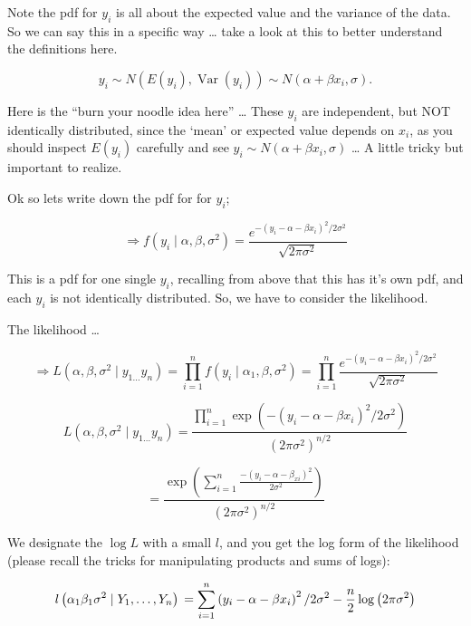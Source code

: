 \documentclass[
  12 pt,
  a4paper,
]{book}
\numberwithin{equation}{section}
\theoremstyle{plain}      %
\theoremstyle{definition} %
\theoremstyle{remark}     %
\theoremstyle{note}         %
\begin{document}
Note the pdf for \(y_{i}\) is all about the expected value and the
variance of the data. So we can say this in a specific way \ldots{} take
a look at this to better understand the definitions here.

\[
y_{i} \sim N\left(E\left(y_{i}\right), \operatorname{Var}\left(y_{i}\right)\right) \sim N\left(\alpha+\beta x_{i}, \sigma\right).
\]

Here is the ``burn your noodle idea here'' \ldots{} These \(y_{i}\) are
independent, but NOT identically distributed, since the `mean' or
expected value depends on \(x_{i}\), as you should inspect
\(E\left(y_{i}\right)\) carefully and see
\(y_{i} \sim N\left(\alpha+\beta x_{i}, \sigma\right)\) \ldots{} A
little tricky but important to realize.

Ok so lets write down the pdf for for \(y_{i}\);

\[
\Rightarrow f\left(y_{i} \mid \alpha, \beta, \sigma^{2}\right)=\frac{e^{-\left(y_{i}-\alpha-\beta x_{i}\right)^{2} / 2 \sigma^{2}}}{\sqrt{2 \pi \sigma^{2}}}
\]

This is a pdf for one single \(y_{i}\), recalling from above that this
has it's own pdf, and each \(y_{i}\) is not identically distributed. So,
we have to consider the likelihood.

The likelihood \ldots{}

\[
\Rightarrow L\left(\alpha,\beta, \sigma^{2} \mid y_{1 \ldots} y_{n}\right)=\prod_{i=1}^{n} f\left(y_{i} \mid \alpha_{1}, \beta, \sigma^{2}\right) = \prod_{i=1}^{n}\frac{e^{-\left(y_{i}-\alpha-\beta x_{i}\right)^{2} / 2 \sigma^{2}}}{\sqrt{2 \pi \sigma^{2}}}
\]

\[
L\left(\alpha,\beta, \sigma^{2} \mid y_{1 \ldots} y_{n}\right) =
\frac{\prod_{i=1}^{n} \exp \left(-\left(y_{i}-\alpha-\beta x_{i}\right)^{2} / 2 \sigma^{2}\right)}{\left(2 \pi \sigma^{2}\right)^{n / 2}}
\]

\[
= \frac{\exp ( \sum_{i=1}^{n} \frac{-\left(y_{i}-\alpha-\beta_{x i}\right)^{2}}{2 \sigma^{2}})}{\left(2 \pi \sigma^{2}\right)^{n / 2}}
\]

We designate the \(\log L\) with a small \(l\), and you get the log form
of the likelihood (please recall the tricks for manipulating products
and sums of logs):

\[
l\left(\alpha_{1} \beta_{1} \sigma^{2} \mid Y_{1}, \ldots, Y_{n}\right) \\
=\sum_{i=1}^{n}\left(y_{i}-\alpha-\beta x_{i}\right)^{2} / 2 \sigma^{2}
-\frac{n}{2} \log \left(2 \pi \sigma^{2}\right)
\]
\end{document}
